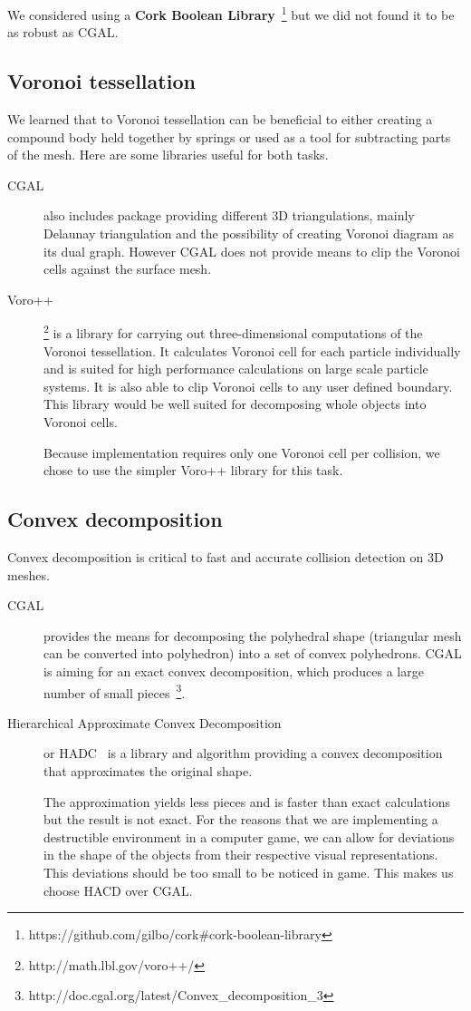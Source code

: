 We considered using a \textbf{Cork Boolean Library}~\footnote{https://github.com/gilbo/cork\#cork-boolean-library} but we did not found it to be as robust as CGAL.

\subsection{Voronoi tessellation}
We learned that to Voronoi tessellation can be beneficial to either creating a compound body held together by springs or used as a tool for subtracting parts of the mesh. Here are some libraries useful for both tasks.

\begin{description}
\item[CGAL] also includes package providing different 3D triangulations, mainly Delaunay triangulation and the possibility of creating Voronoi diagram as its dual graph. However CGAL does not provide means to clip the Voronoi cells against the surface mesh.

\item[Voro++]\footnote{http://math.lbl.gov/voro++/} is a library for carrying out three-dimensional computations of the Voronoi tessellation. It calculates Voronoi cell for each particle individually and is suited for high performance calculations on large scale particle systems. It is also able to clip Voronoi cells to any user defined boundary. This library would be well suited for decomposing whole objects into Voronoi cells. 

Because implementation requires only one Voronoi cell per collision, we chose to use the simpler Voro++ library for this task. 
\end{description}


\subsection{Convex decomposition}
\label{sec:decompositionLib}
Convex decomposition is critical to fast and accurate collision detection on 3D meshes. 
\begin{description}
\item[CGAL] provides the means for decomposing the polyhedral shape (triangular mesh can be converted into polyhedron) into a set of convex polyhedrons. CGAL is aiming for an exact convex decomposition, which produces a large number of small pieces~\footnote{http://doc.cgal.org/latest/Convex\_decomposition\_3}.
\item[Hierarchical Approximate Convex Decomposition] or HADC~\cite{HACD} is a library and algorithm providing a convex decomposition that approximates the original shape. 

The approximation yields less pieces and is faster than exact calculations but the result is not exact. For the reasons that we are implementing a destructible environment in a computer game, we can allow for deviations in the shape of the objects from their respective visual representations. This deviations should be too small to be noticed in game. This makes us choose HACD over CGAL.
\end{description}




